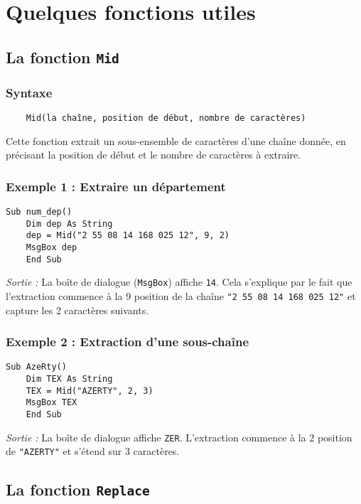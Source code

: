 \documentclass[a4paper,12pt]{report}
\begin{document}
\section{Quelques fonctions utiles}

\subsection{La fonction \texttt{Mid}}

\subsubsection{Syntaxe}
\begin{verbatim}
	Mid(la chaîne, position de début, nombre de caractères)
\end{verbatim}

Cette fonction extrait un sous-ensemble de caractères d'une chaîne donnée, en précisant la position de début et le nombre de caractères à extraire.

\subsubsection{Exemple 1 : Extraire un département}
\begin{lstlisting}[language=VBScript]
	Sub num_dep()
	Dim dep As String
	dep = Mid("2 55 08 14 168 025 12", 9, 2)
	MsgBox dep
	End Sub
\end{lstlisting}

\emph{Sortie :} La boîte de dialogue (\texttt{MsgBox}) affiche \texttt{14}. Cela s'explique par le fait que l'extraction commence à la 9 position de la chaîne \texttt{"2 55 08 14 168 025 12"} et capture les 2 caractères suivants.
\newpage
\subsubsection{Exemple 2 : Extraction d'une sous-chaîne}
\begin{lstlisting}[language=VBScript]
	Sub AzeRty()
	Dim TEX As String
	TEX = Mid("AZERTY", 2, 3)
	MsgBox TEX
	End Sub
\end{lstlisting}

\emph{Sortie :} La boîte de dialogue affiche \texttt{ZER}. L'extraction commence à la 2 position de \texttt{"AZERTY"} et s'étend sur 3 caractères.

\subsection{La fonction \texttt{Replace}}
\end{document}

